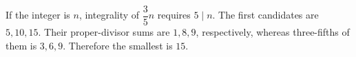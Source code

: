 If the integer is $n$, integrality of $\dfrac{3}{5}n$ requires $5\mid n$. The first candidates are $5,10,15$. Their proper-divisor sums are $1,8,9$, respectively, whereas three-fifths of them is $3,6,9$. Therefore the smallest is $\boxed{15}$.

